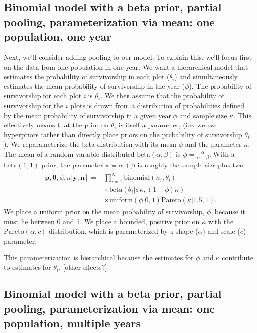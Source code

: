 \documentclass[12pt, oneside, titlepage]{article}   	%
\begin{document}
\subsection*{Binomial model with a beta prior, partial pooling, parameterization via mean: one population, one year}

Next, we'll consider adding pooling to our model. To explain this, we'll focus first on the data from one population in one year. We want a hierarchical model that estimates the probability of survivorship in each plot ($\theta_{i}$) and simultaneously estimates the mean probability of survivorship in the year ($\phi$). The probability of survivorship for each plot $i$ is $\theta_{i}$. We then assume that the probability of survivorship for the $i$ plots is drawn from a distribution of probabilities defined by the mean probability of survivorship in a given year $\phi$ and sample size $\kappa$. This effectively means that the prior on $\theta_{i}$ is itself a parameter; (i.e. we use hyperpriors rather than directly place priors on the probability of survivorship $\theta_{i}$). We reparameterize the beta distribution with its mean $\phi$ and the parameter $\kappa$. The mean of a random variable distributed $\mathrm{beta}(\alpha,\beta)$ is $\phi = \frac{\alpha}{\alpha+\beta}$. With a $\mathrm{beta}(1,1)$ prior, the parameter $\kappa = \alpha + \beta$ is roughly the sample size plus two.
%
\begin{align}
  \begin{split}
[\bm{p},\bm{\theta},\phi,\kappa|\bm{y},\bm{n}]  = & \prod_{i=1}^N \mathrm{binomial}(n_{i},\theta_{i}) 
    \\ & \times \mathrm{beta} (  \theta_{i} | \phi \kappa , (1-\phi) \kappa )
    \\ & \times \mathrm{uniform} ( \phi | 0, 1) \mathrm{Pareto} ( \kappa | 1.5, 1 ). \label{eq:bayesianHyear}
  \end{split}
\end{align}
%
We place a uniform prior on the mean probability of survivorship, $\phi$, because it must lie between 0 and 1. We place a bounded, positive prior on $\kappa$ with the $\mathrm{Pareto}(\alpha,c)$ distribution, which is parameterized by a shape ($\alpha$) and scale ($c$) parameter. 

This parameterization is hierarchical because the estimates for $\phi$ and $\kappa$ contribute to estimates for $\theta_i$. [other effects?]

\subsection*{Binomial model with a beta prior, partial pooling, parameterization via mean: one population, multiple years}
\end{document}
